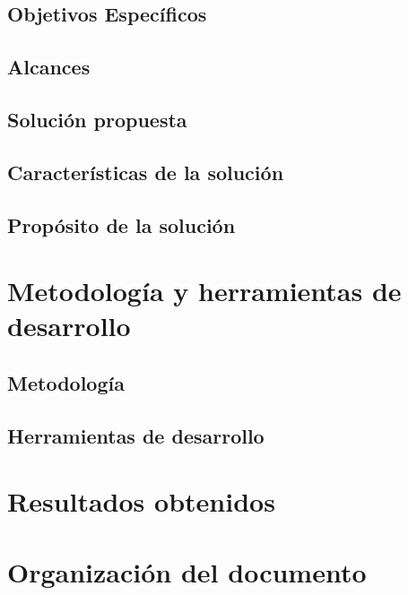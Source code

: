\subsection{Objetivos Espec\'ificos}
\label{intro:objetivosespecificos}





\subsection{Alcances}
\label{intro:alcances}


\subsection{Soluci\'on propuesta}
\label{intro:solucionpropuesta}

\subsection{Caracter\'isticas de la solución}
\label{intro:caracteristicassolucion}



\subsection{Prop\'osito de la solución}
\label{intro:propositosolucion}


\section{Metodolog\'ia y herramientas de desarrollo}
\subsection{Metodolog\'ia}



\subsection{Herramientas de desarrollo}


\section{Resultados obtenidos}


\section{Organizaci\'on del documento}

